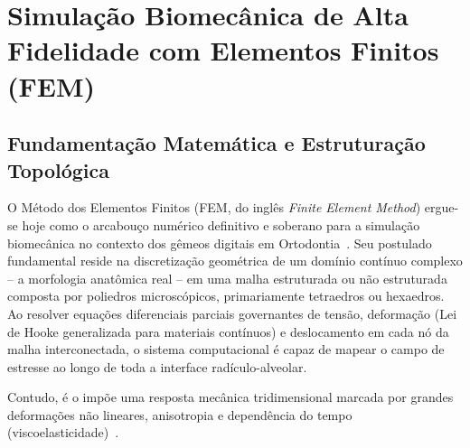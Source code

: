 \section{Simulação Biomecânica de Alta Fidelidade com Elementos Finitos (FEM)}

\subsection{Fundamentação Matemática e Estruturação Topológica}

O Método dos Elementos Finitos (FEM, do inglês \textit{Finite Element Method}) ergue-se hoje como o arcabouço numérico definitivo e soberano para a simulação biomecânica no contexto dos gêmeos digitais em Ortodontia~\cite{zhang2024recursive, li2025impacts}. Seu postulado fundamental reside na discretização geométrica de um domínio contínuo complexo -- a morfologia anatômica real -- em uma malha estruturada ou não estruturada composta por poliedros microscópicos, primariamente tetraedros ou hexaedros. Ao resolver equações diferenciais parciais governantes de tensão, deformação (Lei de Hooke generalizada para materiais contínuos) e deslocamento em cada nó da malha interconectada, o sistema computacional é capaz de mapear o campo de estresse ao longo de toda a interface radículo-alveolar.

Contudo, é o  impõe uma resposta mecânica tridimensional marcada por grandes deformações não lineares, anisotropia e dependência do tempo (viscoelasticidade)~\cite{zhang2024recursive, li2024aligner}.

